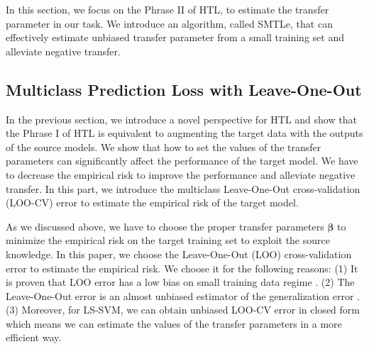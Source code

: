 In this section, we focus on the Phrase II of HTL, to estimate the transfer parameter in our task. We introduce an algorithm, called SMTLe, that can effectively estimate unbiased transfer parameter from a small training set and alleviate negative transfer. 

\subsection{Multiclass Prediction Loss with Leave-One-Out}

In the previous section, we introduce a novel perspective for HTL and show that the Phrase I of HTL is equivalent to augmenting the target data with the outputs of the source models. We show that how to set the values of the transfer parameters can significantly affect the performance of the target model. We have to decrease the empirical risk to improve the performance and alleviate negative transfer. In this part, we introduce the multiclass Leave-One-Out cross-validation  (LOO-CV) error to estimate the empirical risk of the target model.


As we discussed above, we have to choose the proper transfer parameters $\boldsymbol{\beta}$ to minimize the empirical risk on the target training set to exploit the source knowledge.
In this paper, we choose the Leave-One-Out (LOO) cross-validation error to estimate the empirical risk. We choose it for the following reasons: (1) It is proven that LOO error has a low bias on small training data regime \cite{kuzborskij2013stability}. (2) The Leave-One-Out error is an almost unbiased estimator of the generalization error \cite{elisseeff2003leave}. (3) Moreover, for LS-SVM, we can obtain unbiased LOO-CV error in closed form which means we can estimate the values of the transfer parameters in a more efficient way.

